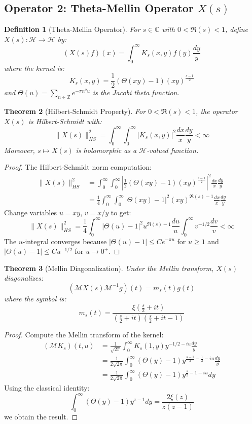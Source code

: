 \documentclass[11pt]{article}
\theoremstyle{plain}
\newtheorem{theorem}{Theorem}[section]
\newtheorem{definition}[theorem]{Definition}
\theoremstyle{remark}
\newcommand{\C}{\mathbb{C}}
\newcommand{\Z}{\mathbb{Z}}
\newcommand{\cH}{\mathcal{H}}
\newcommand{\Mellin}{\mathcal{M}}
\begin{document}
\subsection{Operator 2: Theta-Mellin Operator $X(s)$}

\begin{definition}[Theta-Mellin Operator]
For $s \in \C$ with $0 < \Re(s) < 1$, define $X(s): \cH \to \cH$ by:
\[
(X(s)f)(x) = \int_0^\infty K_s(x,y) f(y) \frac{dy}{y}
\]
where the kernel is:
\[
K_s(x,y) = \frac{1}{2}(\Theta(xy) - 1)(xy)^{\frac{s-1}{2}}
\]
and $\Theta(u) = \sum_{n\in\Z} e^{-\pi n^2 u}$ is the Jacobi theta function.
\end{definition}

\begin{theorem}[Hilbert-Schmidt Property]
For $0 < \Re(s) < 1$, the operator $X(s)$ is Hilbert-Schmidt with:
\[
\|X(s)\|_{HS}^2 = \int_0^\infty \int_0^\infty |K_s(x,y)|^2 \frac{dx}{x} \frac{dy}{y} < \infty
\]
Moreover, $s \mapsto X(s)$ is holomorphic as a $\cH$-valued function.
\end{theorem}

\begin{proof}
The Hilbert-Schmidt norm computation:
\begin{align*}
\|X(s)\|_{HS}^2 &= \int_0^\infty \int_0^\infty \left|\frac{1}{2}(\Theta(xy)-1)(xy)^{\frac{s-1}{2}}\right|^2 \frac{dx}{x} \frac{dy}{y} \\
&= \frac{1}{4} \int_0^\infty \int_0^\infty |\Theta(xy)-1|^2 (xy)^{\Re(s)-1} \frac{dx}{x} \frac{dy}{y}
\end{align*}
Change variables $u = xy$, $v = x/y$ to get:
\[
\|X(s)\|_{HS}^2 = \frac{1}{4} \int_0^\infty |\Theta(u)-1|^2 u^{\Re(s)-1} \frac{du}{u} \int_0^\infty v^{-1/2} \frac{dv}{v} < \infty
\]
The $u$-integral converges because $|\Theta(u)-1| \leq C e^{-\pi u}$ for $u \geq 1$ and $|\Theta(u)-1| \leq C u^{-1/2}$ for $u \to 0^+$.
\end{proof}

\begin{theorem}[Mellin Diagonalization]
Under the Mellin transform, $X(s)$ diagonalizes:
\[
(\Mellin X(s) \Mellin^{-1} g)(t) = m_s(t) g(t)
\]
where the symbol is:
\[
m_s(t) = \frac{\xi\left(\frac{s}{2} + it\right)}{\left(\frac{s}{2} + it\right)\left(\frac{s}{2} + it - 1\right)}
\]
\end{theorem}

\begin{proof}
Compute the Mellin transform of the kernel:
\begin{align*}
(\Mellin K_s)(t,u) &= \frac{1}{\sqrt{2\pi}} \int_0^\infty K_s(1,y) y^{-1/2 - iu} \frac{dy}{y} \\
&= \frac{1}{2\sqrt{2\pi}} \int_0^\infty (\Theta(y)-1) y^{\frac{s-1}{2} - \frac{1}{2} - iu} \frac{dy}{y} \\
&= \frac{1}{2\sqrt{2\pi}} \int_0^\infty (\Theta(y)-1) y^{\frac{s}{2} - 1 - iu} dy
\end{align*}
Using the classical identity:
\[
\int_0^\infty (\Theta(y)-1) y^{z-1} dy = \frac{2\xi(z)}{z(z-1)}
\]
we obtain the result.
\end{proof}
\end{document}
